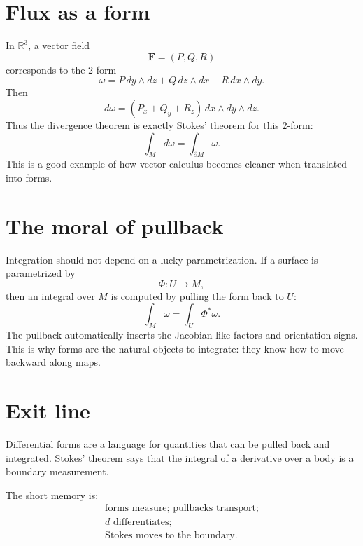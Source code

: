 \section{Flux as a form}

In \(\mathbb R^3\), a vector field
\[
  \mathbf F=(P,Q,R)
\]
corresponds to the \(2\)-form
\[
  \omega=P\,dy\wedge dz+Q\,dz\wedge dx+R\,dx\wedge dy.
\]
Then
\[
  d\omega=(P_x+Q_y+R_z)\,dx\wedge dy\wedge dz.
\]
Thus the divergence theorem is exactly Stokes' theorem for this \(2\)-form:
\[
  \int_M d\omega=\int_{\partial M}\omega.
\]
This is a good example of how vector calculus becomes cleaner when translated into forms.

\section{The moral of pullback}

Integration should not depend on a lucky parametrization.  If a surface is parametrized by
\[
  \Phi:U\to M,
\]
then an integral over \(M\) is computed by pulling the form back to \(U\):
\[
  \int_M\omega=\int_U\Phi^*\omega.
\]
The pullback automatically inserts the Jacobian-like factors and orientation signs.  This is why forms are the natural objects to integrate: they know how to move backward along maps.

\section{Exit line}

Differential forms are a language for quantities that can be pulled back and integrated. Stokes' theorem says that the integral of a derivative over a body is a boundary measurement.

The short memory is:
\[
\begin{array}{c}
  \text{forms measure; pullbacks transport;}\\
  d\text{ differentiates;}\\
  \text{Stokes moves to the boundary.}
\end{array}
\]
